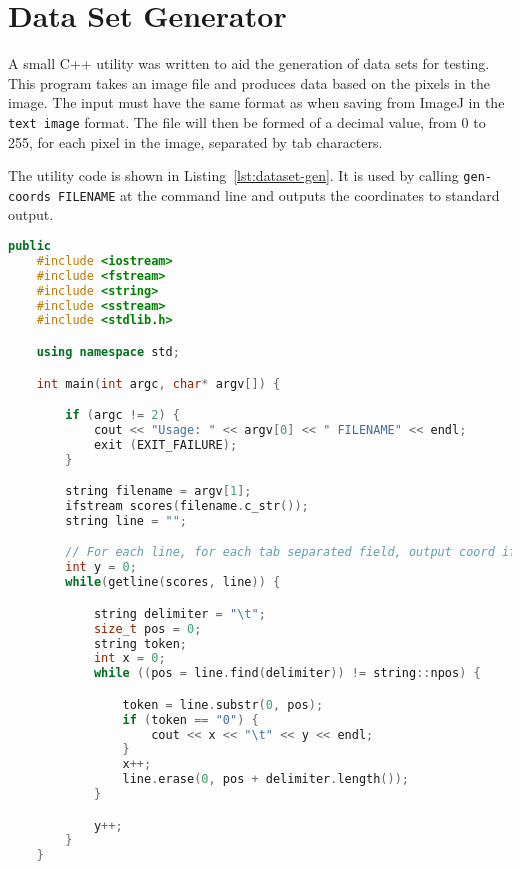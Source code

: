 
\chapter{Data Set Generator}
\label{sec:dataset_generator}

A small C++ utility was written to aid the generation of data sets for testing.
This program takes an image file and produces data based on the pixels in the
image. The input must have the same format as when saving from ImageJ in the
\texttt{text image} format. The file will then be formed of a decimal value,
from 0 to 255, for each pixel in the image, separated by tab characters.

The utility code is shown in Listing~\ref{lst:dataset-gen}. It is used by
calling \texttt{gen-coords FILENAME} at the command line and outputs the
coordinates to standard output.

\begin{center}
\begin{minipage}{\textwidth}
	\begin{lstlisting}[caption={Utility to gen data sets from images.},
	label=lst:dataset-gen, language=c++, linewidth=12cm, firstnumber=1] public
	#include <iostream>
	#include <fstream>
	#include <string>
	#include <sstream>
	#include <stdlib.h>

	using namespace std;

	int main(int argc, char* argv[]) {

		if (argc != 2) {
			cout << "Usage: " << argv[0] << " FILENAME" << endl;
			exit (EXIT_FAILURE);
		}

		string filename = argv[1];
		ifstream scores(filename.c_str());
		string line = "";

		// For each line, for each tab separated field, output coord if 0.
		int y = 0;
		while(getline(scores, line)) {

			string delimiter = "\t";
			size_t pos = 0;
			string token;
			int x = 0;
			while ((pos = line.find(delimiter)) != string::npos) {

				token = line.substr(0, pos);
				if (token == "0") {
					cout << x << "\t" << y << endl;
				}
				x++;
				line.erase(0, pos + delimiter.length());
			}

			y++;
		}
	}
\end{lstlisting}
\end{minipage}
\end{center}
